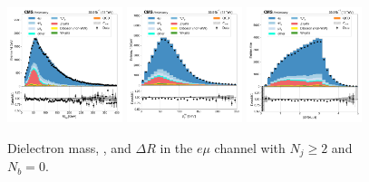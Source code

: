 \begin{figure}[htb!]
    \centering
    \includegraphics[width=0.3\textwidth]{chapters/Analysis/sectionPlots/figures/data_mc_overlays/emu_2016_cat_gt2_eq0_signal_linear_lepton_dilepton1_mass}
    \includegraphics[width=0.3\textwidth]{chapters/Analysis/sectionPlots/figures/data_mc_overlays/emu_2016_cat_gt2_eq0_signal_linear_lepton_dilepton1_pt}
    \includegraphics[width=0.3\textwidth]{chapters/Analysis/sectionPlots/figures/data_mc_overlays/emu_2016_cat_gt2_eq0_signal_linear_lepton_dilepton1_delta_r}
    \caption{Dielectron mass, \pt, and $\Delta R$ in the $e\mu$ channel
    with $N_{j} \geq 2$ and $N_{b} = 0$.}
    \label{fig:analysis:plots:emu_4_dilepton}
\end{figure}

